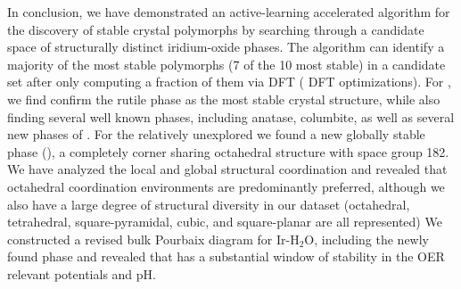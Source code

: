 


%
In conclusion, we have demonstrated an active-learning accelerated algorithm for the discovery of stable crystal polymorphs by searching through a candidate space of structurally distinct iridium-oxide phases.
%
The algorithm can identify a majority of the most stable polymorphs (7 of the 10 most stable) in a candidate set after only computing a fraction of them via DFT ( DFT optimizations).
%
For \IrOtwo, we find confirm the rutile phase as the most stable crystal structure, while also finding several well known phases, including anatase, columbite, as well as several new phases of \IrOtwo.
%
For the relatively unexplored \IrOthree we found a new globally stable phase (\aIrOthree), a completely corner sharing octahedral structure with space group 182.
%
%
We have analyzed the local and global structural coordination and revealed that octahedral coordination environments are predominantly preferred, although we also have a large degree of structural diversity in our dataset (octahedral, tetrahedral, square-pyramidal, cubic, and square-planar are all represented)
%
%
We constructed a revised bulk Pourbaix diagram for Ir-H$_2$O, including the newly found \aIrOthree phase and revealed that \aIrOthree has a substantial window of stability in the OER relevant potentials and pH.

